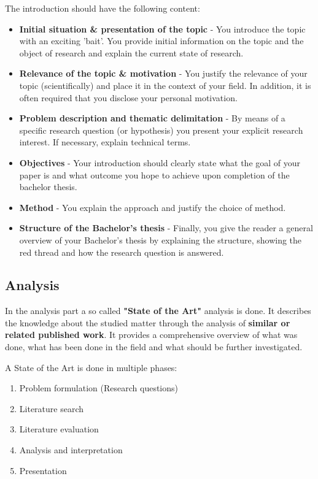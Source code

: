 \documentclass[a4paper,11pt,fleqn]{book}
\begin{document}
The introduction should have the following content:
\begin{itemize}
  \item \textbf{Initial situation & presentation of the topic} - You introduce the topic with an exciting 'bait'. You provide initial information on the topic and the object of research and explain the current state of research.
  \item \textbf{Relevance of the topic & motivation} - You justify the relevance of your topic (scientifically) and place it in the context of your field. In addition, it is often required that you disclose your personal motivation.
  \item \textbf{Problem description and thematic delimitation} - By means of a specific research question (or hypothesis) you present your explicit research interest. If necessary, explain technical terms.
  \item \textbf{Objectives} - Your introduction should clearly state what the goal of your paper is and what outcome you hope to achieve upon completion of the bachelor thesis.
  \item \textbf{Method} - You explain the approach and justify the choice of method.
  \item \textbf{Structure of the Bachelor's thesis} - Finally, you give the reader a general overview of your Bachelor's thesis by explaining the structure, showing the red thread and how the research question is answered.
\end{itemize}

\subsection{Analysis}
In the analysis part a so called \textbf{"State of the Art"} analysis is done. It describes the knowledge about the studied matter through the analysis of \textbf{similar or related published work}. It provides a comprehensive overview of what was done, what has been done in the field and what should be further investigated.

A State of the Art is done in multiple phases:
\begin{enumerate}
  \item Problem formulation (Research questions)
  \item Literature search
  \item Literature evaluation
  \item Analysis and interpretation
  \item Presentation
\end{enumerate}
\end{document}
